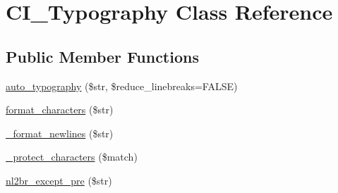 \hypertarget{class_c_i___typography}{\section{C\-I\-\_\-\-Typography Class Reference}
\label{class_c_i___typography}
}
\subsection*{Public Member Functions}
\begin{DoxyCompactItemize}
\item 
\hyperlink{class_c_i___typography_a24c284b560f34d6c7fad07e36baaa024}{auto\-\_\-typography} (\$str, \$reduce\-\_\-linebreaks=F\-A\-L\-S\-E)
\item 
\hyperlink{class_c_i___typography_a45df135c8811c2b27085dbdfd05a1eed}{format\-\_\-characters} (\$str)
\item 
\hyperlink{class_c_i___typography_ac3384cbfc88fcd17e40624bdd6002801}{\-\_\-format\-\_\-newlines} (\$str)
\item 
\hyperlink{class_c_i___typography_a03e8f97de4301e0fe0cf0e9f0bcd936c}{\-\_\-protect\-\_\-characters} (\$match)
\item 
\hyperlink{class_c_i___typography_af9db9732eaa94a62b3a3ccc7f6bf860b}{nl2br\-\_\-except\-\_\-pre} (\$str)
\end{DoxyCompactItemize}
